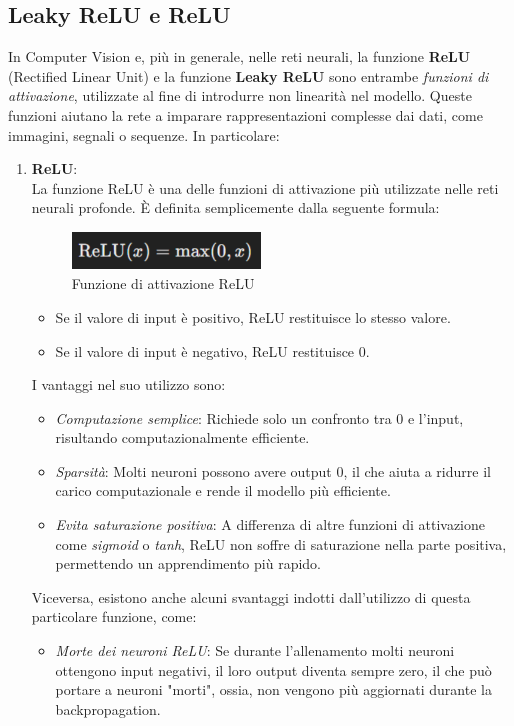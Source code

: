 \documentclass[12pt,a4paper,openright,twoside]{book}
\begin{document}
\subsection{Leaky ReLU e ReLU}
In Computer Vision e, più in generale, nelle reti neurali, la funzione \textbf{ReLU} (Rectified Linear Unit) e la funzione \textbf{Leaky ReLU} sono entrambe {\itshape funzioni di attivazione}, utilizzate al fine di introdurre non linearità nel modello. Queste funzioni aiutano la rete a imparare rappresentazioni complesse dai dati, come immagini, segnali o sequenze. In particolare:
\begin{enumerate}
\item \textbf{ReLU}:\\
La funzione ReLU è una delle funzioni di attivazione più utilizzate nelle reti neurali profonde. È definita semplicemente dalla seguente formula:

\begin{figure}[H]
  	\centering
   	\includegraphics[height=1cm, width=5cm]{figures/relu.pdf}
    	\caption{Funzione di attivazione ReLU}
	\label{fig:relu}
\end{figure}

\begin{itemize}
\item Se il valore di input è positivo, ReLU restituisce lo stesso valore.
\item Se il valore di input è negativo, ReLU restituisce 0.
\end{itemize}

I vantaggi nel suo utilizzo sono:
\begin{itemize}
\item {\itshape Computazione semplice}: Richiede solo un confronto tra 0 e l'input, risultando computazionalmente efficiente.
\item {\itshape Sparsità}: Molti neuroni possono avere output 0, il che aiuta a ridurre il carico computazionale e rende il modello più efficiente.
\item{\itshape Evita saturazione positiva}: A differenza di altre funzioni di attivazione come {\itshape sigmoid} o {\itshape tanh}, ReLU non soffre di saturazione nella parte positiva, permettendo un apprendimento più rapido.
\end{itemize}
Viceversa, esistono anche alcuni svantaggi indotti dall'utilizzo di questa particolare funzione, come:
\begin{itemize}
\item {\itshape Morte dei neuroni ReLU}: Se durante l'allenamento molti neuroni ottengono input negativi, il loro output diventa sempre zero, il che può portare a neuroni "morti", ossia, non vengono più aggiornati durante la backpropagation.
\end{itemize}


\end{enumerate}
\end{document}
